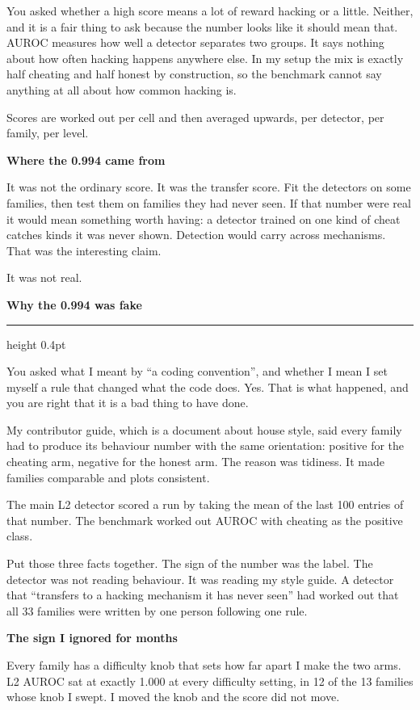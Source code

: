 \documentclass[11pt,a4paper]{article}
\newcommand{\heading}[1]{%
  \par\vspace{1.5em}%
  \phantomsection\addcontentsline{toc}{section}{#1}%
  {\sffamily\bfseries\large #1}%
  \par\vspace{0.15em}%
  \hrule height 0.4pt%
  \par\vspace{0.5em}%
}
\newcommand{\subhead}[1]{%
  \par\vspace{0.9em}%
  {\sffamily\bfseries #1}%
  \par\vspace{0.15em}%
}
\begin{document}
You asked whether a high score means a lot of reward hacking or a little. Neither,
and it is a fair thing to ask because the number looks like it should mean that.
AUROC measures how well a detector separates two groups. It says nothing about how
often hacking happens anywhere else. In my setup the mix is exactly half cheating
and half honest by construction, so the benchmark cannot say anything at all about
how common hacking is.

Scores are worked out per cell and then averaged upwards, per detector, per family,
per level.

\subhead{Where the 0.994 came from}
It was not the ordinary score. It was the transfer score. Fit the detectors on some
families, then test them on families they had never seen. If that number were real
it would mean something worth having: a detector trained on one kind of cheat
catches kinds it was never shown. Detection would carry across mechanisms. That was
the interesting claim.

It was not real.

\heading{Why the 0.994 was fake}
\label{h:bug}

You asked what I meant by ``a coding convention'', and whether I mean I set myself
a rule that changed what the code does. Yes. That is what happened, and you are
right that it is a bad thing to have done.

My contributor guide, which is a document about house style, said every family had
to produce its behaviour number with the same orientation: positive for the
cheating arm, negative for the honest arm. The reason was tidiness. It made
families comparable and plots consistent.

The main L2 detector scored a run by taking the mean of the last 100 entries of
that number. The benchmark worked out AUROC with cheating as the positive class.

Put those three facts together. The sign of the number was the label. The detector
was not reading behaviour. It was reading my style guide. A detector that
``transfers to a hacking mechanism it has never seen'' had worked out that all 33
families were written by one person following one rule.

\subhead{The sign I ignored for months}
Every family has a difficulty knob that sets how far apart I make the two arms. L2
AUROC sat at exactly 1.000 at every difficulty setting, in 12 of the 13 families
whose knob I swept. I moved the knob and the score did not move.
\end{document}
